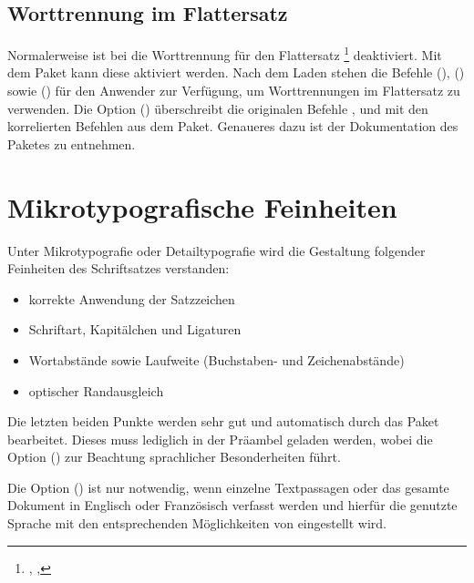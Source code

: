 \documentclass[%
  english,ngerman,%
  cdgeometry=no,DIV=12,%
  automark,%
  listof=toc,%
]{tudscrartcl}
\begin{document}
\subsection{Worttrennung im Flattersatz}
Normalerweise ist bei  die Worttrennung für den Flattersatz%
\footnote{, , } 
deaktiviert. Mit dem Paket  kann diese aktiviert werden. Nach 
dem Laden stehen die Befehle (), 
() sowie 
() für den Anwender zur Verfügung, um 
Worttrennungen im Flattersatz zu verwenden. Die Option 
() überschreibt die originalen Befehle 
,  und  mit den 
korrelierten Befehlen aus dem Paket. Genaueres dazu ist der Dokumentation des 
Paketes zu entnehmen.



\section{Mikrotypografische Feinheiten}
Unter Mikrotypografie oder Detailtypografie wird die Gestaltung folgender 
Feinheiten des Schriftsatzes verstanden:
\begin{itemize}[noitemsep]
\item korrekte Anwendung der Satzzeichen
\item Schriftart, Kapitälchen und Ligaturen
\item Wortabstände sowie Laufweite (Buchstaben- und Zeichenabstände)
\item optischer Randausgleich
\end{itemize}

\noindent Die letzten beiden Punkte werden sehr gut und automatisch durch das 
Paket  bearbeitet. Dieses muss lediglich in der Präambel 
geladen werden, wobei die Option () zur 
Beachtung sprachlicher Besonderheiten führt.
%
\begin{Preamble}
\usepackage[babel]{microtype}

\end{Preamble}
%
Die Option () ist nur notwendig, wenn einzelne 
Textpassagen oder das gesamte Dokument in Englisch oder Französisch verfasst 
werden und hierfür die genutzte Sprache mit den entsprechenden Möglichkeiten 
von  eingestellt wird.
\end{document}
